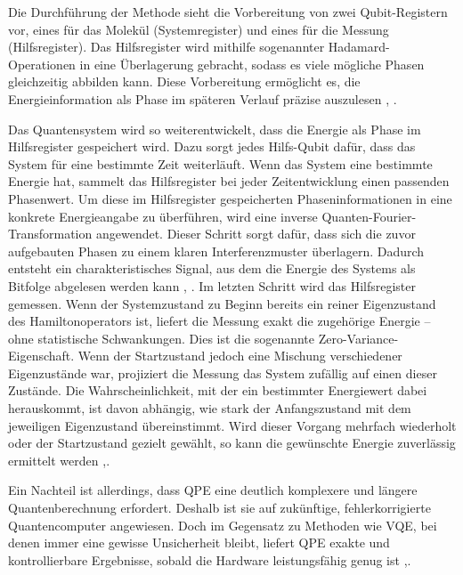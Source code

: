 Die Durchführung der Methode sieht die Vorbereitung von zwei Qubit-Registern vor, eines für das Molekül (Systemregister) und eines für die Messung (Hilfsregister). Das Hilfsregister wird mithilfe sogenannter Hadamard-Operationen in eine Überlagerung gebracht, sodass es viele mögliche Phasen gleichzeitig abbilden kann. Diese Vorbereitung ermöglicht es, die Energieinformation als Phase im späteren Verlauf präzise auszulesen \citealp[25]{weidmanQuantumComputingChemistry2024a}, \citealp[29]{mottaEmergingQuantumComputing2022}. 

Das Quantensystem wird so weiterentwickelt, dass die Energie als Phase im Hilfsregister gespeichert wird. Dazu sorgt jedes Hilfs-Qubit dafür, dass das System für eine bestimmte Zeit weiterläuft. Wenn das System eine bestimmte Energie hat, sammelt das Hilfsregister bei jeder Zeitentwicklung einen passenden Phasenwert. Um diese im Hilfsregister gespeicherten Phaseninformationen in eine konkrete Energieangabe zu überführen, wird eine inverse Quanten-Fourier-Transformation angewendet. Dieser Schritt sorgt dafür, dass sich die zuvor aufgebauten Phasen zu einem klaren Interferenzmuster überlagern. Dadurch entsteht ein charakteristisches Signal, aus dem die Energie des Systems als Bitfolge abgelesen werden kann \citealp[7]{vonburgQuantumComputingEnhanced2021}, \citealp[25]{mottaEmergingQuantumComputing2022}. Im letzten Schritt wird das Hilfsregister gemessen. Wenn der Systemzustand zu Beginn bereits ein reiner Eigenzustand des Hamiltonoperators ist, liefert die Messung exakt die zugehörige Energie – ohne statistische Schwankungen. Dies ist die sogenannte Zero-Variance-Eigenschaft. Wenn der Startzustand jedoch eine Mischung verschiedener Eigenzustände war, projiziert die Messung das System zufällig auf einen dieser Zustände. Die Wahrscheinlichkeit, mit der ein bestimmter Energiewert dabei herauskommt, ist davon abhängig, wie stark der Anfangszustand mit dem jeweiligen Eigenzustand übereinstimmt. Wird dieser Vorgang mehrfach wiederholt oder der Startzustand gezielt gewählt, so kann die gewünschte Energie zuverlässig ermittelt werden \citealp[7]{vonburgQuantumComputingEnhanced2021},\citealp[25]{mottaEmergingQuantumComputing2022}.

Ein Nachteil ist allerdings, dass QPE eine deutlich komplexere und längere Quantenberechnung erfordert. Deshalb ist sie auf zukünftige, fehlerkorrigierte Quantencomputer angewiesen. Doch im Gegensatz zu Methoden wie VQE, bei denen immer eine gewisse Unsicherheit bleibt, liefert QPE exakte und kontrollierbare Ergebnisse, sobald die Hardware leistungsfähig genug ist \citealp[7]{vonburgQuantumComputingEnhanced2021},\citealp[25]{mottaEmergingQuantumComputing2022}.



